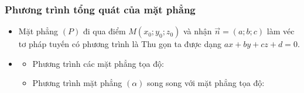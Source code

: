 \subsubsection{Phương trình tổng quát của mặt phẳng}
\begin{itemize}
	\item [\iconMT]  Mặt phẳng $(P)$ đi qua điểm $M(x_0;y_0;z_0)$ và nhận $\vec{n}=(a;b;c)$ làm véc tơ pháp tuyến có phương trình là 
	Thu gọn ta được dạng $ax+by+cz+d=0$.
	\item [\iconMT] 
	\begin{boxdn}
		\begin{itemize}
			\item [\ding{172}] Phương trình các mặt phẳng tọa độ: 
			\item [\ding{173}] Phương trình mặt phẳng $(\alpha)$ song song với mặt phẳng tọa độ: 
		\end{itemize}
	\end{boxdn}
\end{itemize}

